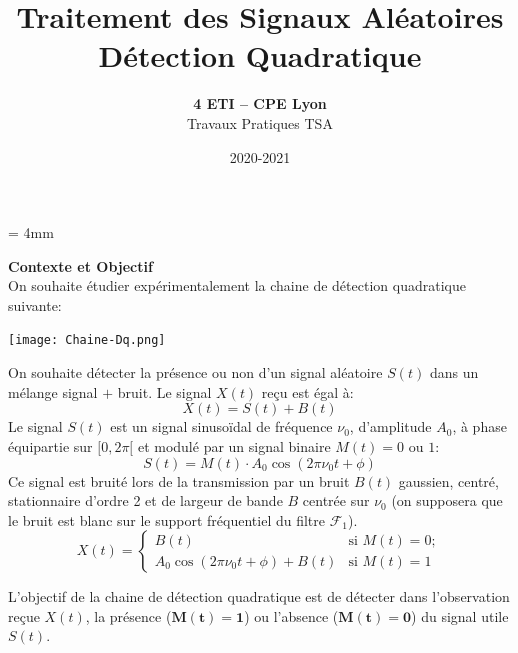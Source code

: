 \documentclass{article}
\begin{document}
\baselineskip = 4mm
\title{Traitement des Signaux Aléatoires \\
Détection Quadratique}
\author{\textbf{4 ETI -- CPE Lyon }\\[3mm]
{Travaux Pratiques TSA}}
\date{2020-2021}

\maketitle

\noindent{}
\vspace*{5mm}


\textbf{\Large Contexte et Objectif}\\[4mm]

On souhaite étudier expérimentalement la chaine de détection quadratique suivante:\\

\begin{center}
\texttt{[image: Chaine-Dq.png]}
\end{center}

On souhaite détecter la présence ou non d'un signal aléatoire $S(t)$ dans un mélange signal $+$ bruit. Le signal $X(t)$ reçu est égal à:
$$
X(t) = S(t) + B(t) 
$$
Le signal $S(t)$ est un signal sinusoïdal de fréquence $\nu_0$, d'amplitude $A_0$, à phase équipartie sur $[0,2\pi[$ et modulé par un signal binaire $M(t) =  0$ ou $1$:
$$
S(t) = M(t) \cdot A_0 \cos (2\pi\nu_0 t + \phi) 
$$
Ce signal est bruité lors de la transmission par un bruit $B(t)$ gaussien, centré, stationnaire d'ordre 2 et de largeur de bande $B$ centrée sur $\nu_0$ (on supposera que le bruit est blanc sur le support fréquentiel du  filtre $\mathcal{F}_1$).
$$
X(t) = \left\{\begin{array}{ll}
B(t) & \mbox{si } M(t) = 0 ;\\[1mm]
A_0 \cos(2\pi\nu_0 t + \phi) + B(t) & \mbox{si } M(t) = 1
\end{array}
\right.
$$

L'objectif de la chaine de détection quadratique est de détecter dans l'observation reçue  $X(t)$, la présence ($\mathbf{M(t)=1}$) ou l'absence ($\mathbf{M(t) = 0}$) du signal utile $S(t)$.

\vspace*{5mm}
\end{document}
